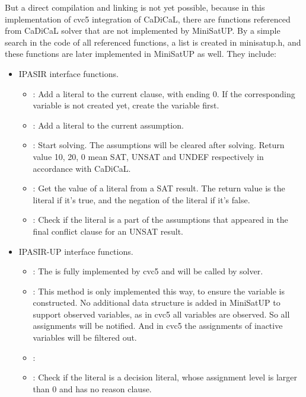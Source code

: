 But a direct compilation and linking is not yet possible, because in this implementation of cvc5 integration of CaDiCaL, there are functions referenced from CaDiCaL solver that are not implemented by MiniSatUP. By a simple search in the code of all referenced functions, a list is created in minisatup.h, and these functions are later implemented in MiniSatUP as well. They include:

\begin{itemize}
  \item IPASIR interface functions.
  \begin{itemize}
    \item {}: Add a literal to the current clause, with ending 0. If the corresponding variable is not created yet, create the variable first.
    \item {}: Add a literal to the current assumption.
    \item {}: Start solving. The assumptions will be cleared after solving. Return value 10, 20, 0 mean SAT, UNSAT and UNDEF respectively in accordance with CaDiCaL.
    \item {}: Get the value of a literal from a SAT result. The return value is the literal if it's true, and the negation of the literal if it's false.
    \item {}: Check if the literal is a part of the assumptions that appeared in the final conflict clause for an UNSAT result.
  \end{itemize}
  \item IPASIR-UP interface functions.
  \begin{itemize}
    \item {}: The  is fully implemented by cvc5 and will be called by solver.
    \item {}: This method is only implemented this way, to ensure the variable is constructed. No additional data structure is added in MiniSatUP to support observed variables, as in cvc5 all variables are observed. So all assignments will be notified. And in cvc5 the assignments of inactive variables will be filtered out.
    \item {}:
    \item {}: Check if the literal is a decision literal, whose assignment level is larger than 0 and has no reason clause.

\end{itemize}
\end{itemize}
